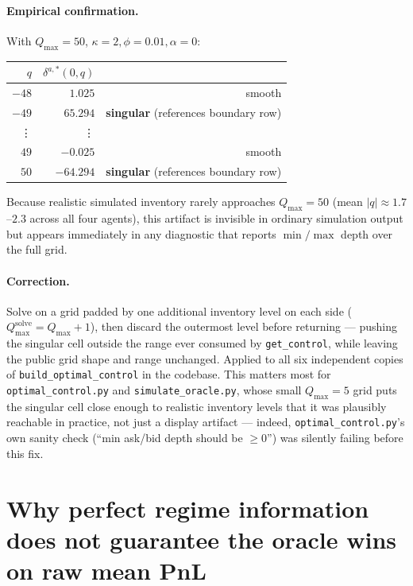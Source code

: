 \documentclass[11pt]{article}
\begin{document}
\paragraph{Empirical confirmation.} With $Q_{\max}=50$, $\kappa=2,\phi=0.01,\alpha=0$:
\begin{center}
\begin{tabular}{@{}rrr@{}}
\toprule
$q$ & $\delta^{a,*}(0,q)$ & \\
\midrule
$-48$ & $1.025$ & smooth \\
$-49$ & $65.294$ & \textbf{singular} (references boundary row) \\
\vdots & \vdots & \\
$49$ & $-0.025$ & smooth \\
$50$ & $-64.294$ & \textbf{singular} (references boundary row) \\
\bottomrule
\end{tabular}
\end{center}
Because realistic simulated inventory rarely approaches $Q_{\max}=50$ (mean $|q| \approx 1.7$--$2.3$ across all four agents), this artifact is invisible in ordinary simulation output but appears immediately in any diagnostic that reports $\min/\max$ depth over the full grid.

\paragraph{Correction.} Solve on a grid padded by one additional inventory level on each side ($Q_{\max}^{\text{solve}} = Q_{\max}+1$), then discard the outermost level before returning — pushing the singular cell outside the range ever consumed by \texttt{get\_control}, while leaving the public grid shape and range unchanged. Applied to all six independent copies of \texttt{build\_optimal\_control} in the codebase. This matters most for \texttt{optimal\_control.py} and \texttt{simulate\_oracle.py}, whose small $Q_{\max}=5$ grid puts the singular cell close enough to realistic inventory levels that it was plausibly reachable in practice, not just a display artifact — indeed, \texttt{optimal\_control.py}'s own sanity check (``min ask/bid depth should be $\ge 0$'') was silently failing before this fix.

\section{Why perfect regime information does not guarantee the oracle wins on raw mean PnL}
\label{sec:discussion}
\end{document}
